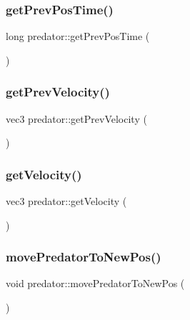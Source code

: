 \subsubsection{\texorpdfstring{get\+Prev\+Pos\+Time()}{getPrevPosTime()}}
{\footnotesize\ttfamily long predator\+::get\+Prev\+Pos\+Time (\begin{DoxyParamCaption}{ }\end{DoxyParamCaption})}

\mbox{\label{classpredator_afbcd7455722b197a8c0c34d75f6c4c1c}} 
\subsubsection{\texorpdfstring{get\+Prev\+Velocity()}{getPrevVelocity()}}
{\footnotesize\ttfamily vec3 predator\+::get\+Prev\+Velocity (\begin{DoxyParamCaption}{ }\end{DoxyParamCaption})}

\mbox{\label{classpredator_ae29430ec8d6778b8c72ae485b75d8dda}} 
\subsubsection{\texorpdfstring{get\+Velocity()}{getVelocity()}}
{\footnotesize\ttfamily vec3 predator\+::get\+Velocity (\begin{DoxyParamCaption}{ }\end{DoxyParamCaption})}

\mbox{\label{classpredator_a065cda3b3c5f2d676d38d0be456311f7}} 
\subsubsection{\texorpdfstring{move\+Predator\+To\+New\+Pos()}{movePredatorToNewPos()}}
{\footnotesize\ttfamily void predator\+::move\+Predator\+To\+New\+Pos (\begin{DoxyParamCaption}{ }\end{DoxyParamCaption})}

